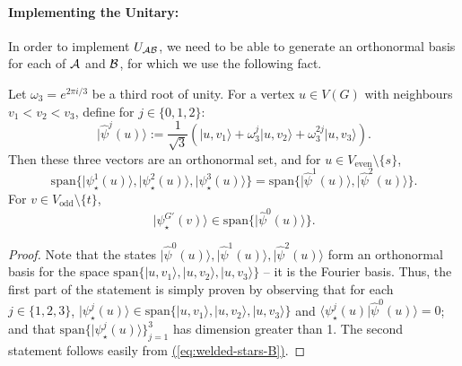 \documentclass{article}
\newcommand{\eq}[1]{\hyperref[eq:#1]{(\ref*{eq:#1})}}
\def\ket#1{{\lvert}#1\rangle}
\renewcommand{\>}{\rangle}
\newcommand{\<}{\langle}
\renewcommand{\(}{\left(}
\renewcommand{\)}{\right)}
\def\braket#1#2{{{\langle}#1\vert}#2\rangle}
\begin{document}
\paragraph{Implementing the Unitary:} In order to implement $U_{\cal AB}$, we need to be able to generate an orthonormal basis for each of ${\cal A}$ and ${\cal B}$, for which we use the following fact. 
\begin{claim}\label{clm:welded-F-basis}
Let $\omega_3=e^{2\pi i/3}$ be a third root of unity.
For a vertex $u\in V(G)$ with neighbours $v_1<v_2<v_3$, define for $j\in\{0,1,2\}$:
$$\ket{\widehat\psi^j(u)}:=\frac{1}{\sqrt{3}}\left(\ket{u,v_1}+\omega_3^j\ket{u,v_2}+\omega_3^{2j}\ket{u,v_3}\right).$$
Then these three vectors are an orthonormal set, and for $u\in V_{\mathrm{even}}\setminus\{s\}$,
$$\mathrm{span}\{\ket{\psi_\star^1(u)},\ket{\psi_\star^2(u)},\ket{\psi_\star^3(u)}\}=\mathrm{span}\{\ket{\widehat\psi^1(u)},\ket{\widehat\psi^2(u)}\}.$$
For $v\in V_{\mathrm{odd}}\setminus \{t\}$, 
$$\ket{\psi_\star^{G'}(v)}\in\mathrm{span}\{\ket{\widehat\psi^0(u)}\}.$$
\end{claim}
\begin{proof}
Note that the states $\ket{\widehat{\psi}^0(u)},\ket{\widehat{\psi}^1(u)},\ket{\widehat{\psi}^2(u)}$ form an orthonormal basis for the space $\mathrm{span}\{\ket{u,v_1},\ket{u,v_2},\ket{u,v_3}\}$ -- it is the Fourier basis. Thus, the first part of the statement is simply proven by observing that for each $j\in\{1,2,3\}$, $\ket{\psi_\star^j(u)}\in\mathrm{span}\{\ket{u,v_1},\ket{u,v_2},\ket{u,v_3}\}$ and $\braket{\psi_\star^j(u)}{\widehat{\psi}^0(u)}=0$; and that $\mathrm{span}\{\ket{\psi_\star^j(u)}\}_{j=1}^3$ has dimension greater than 1.
The second statement follows easily from \eq{welded-stars-B}.
\end{proof}
\end{document}
